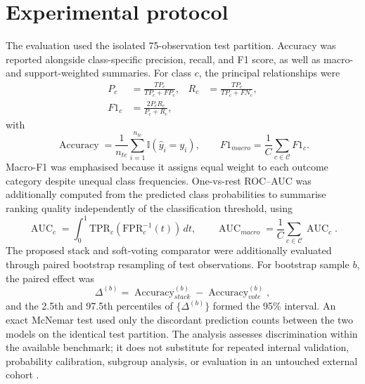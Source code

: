 \documentclass[a4paper,fleqn]{cas-dc}
\begin{document}
\section{Experimental protocol}
\label{sec:protocol}
The evaluation used the isolated 75-observation test partition. Accuracy was reported alongside class-specific precision, recall, and F1 score, as well as macro- and support-weighted summaries. For class $c$, the principal relationships were
\begin{equation}
\begin{aligned}
P_c&=\frac{TP_c}{TP_c+FP_c}, &
R_c&=\frac{TP_c}{TP_c+FN_c},\\
F1_c&=\frac{2P_cR_c}{P_c+R_c},
\end{aligned}
\label{eq:classmetrics}
\end{equation}
with
\begin{equation}
\operatorname{Accuracy}=\frac{1}{n_{te}}\sum_{i=1}^{n_{te}}\mathbb{I}(\hat y_i=y_i),
\qquad
F1_{macro}=\frac{1}{C}\sum_{c\in\mathcal{C}}F1_c.
\label{eq:aggregatemetrics}
\end{equation}
Macro-F1 was emphasised because it assigns equal weight to each outcome category despite unequal class frequencies. One-vs-rest ROC--AUC \cite{fawcett2006} was additionally computed from the predicted class probabilities to summarise ranking quality independently of the classification threshold, using
\begin{equation}
\operatorname{AUC}_c=\int_0^1 \mathrm{TPR}_c(\mathrm{FPR}_c^{-1}(t))\,dt,
\qquad
\operatorname{AUC}_{macro}=\frac{1}{C}\sum_{c\in\mathcal{C}}\operatorname{AUC}_c.
\label{eq:auc}
\end{equation}
The proposed stack and soft-voting comparator were additionally evaluated through paired bootstrap resampling of test observations. For bootstrap sample $b$, the paired effect was
\begin{equation}
\Delta^{(b)}=\operatorname{Accuracy}^{(b)}_{stack}
-\operatorname{Accuracy}^{(b)}_{vote},
\label{eq:bootstrap}
\end{equation}
and the 2.5th and 97.5th percentiles of $\{\Delta^{(b)}\}$ formed the 95\% interval. An exact McNemar test used only the discordant prediction counts between the two models on the identical test partition. The analysis assesses discrimination within the available benchmark; it does not substitute for repeated internal validation, probability calibration, subgroup analysis, or evaluation in an untouched external cohort \cite{collins2024,riley2024,rileysample2024}.
\end{document}
